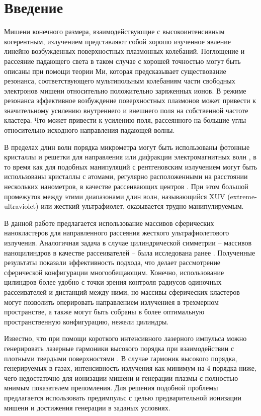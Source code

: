 \section{Введение}

Мишени конечного размера, взаимодействующие с высокоинтенсивным когерентным, излучением представляют собой хорошо изученное явление линейно возбужденных 
поверхностных плазмонных колебаний. Поглощение и рассеяние падающего света в таком случае с хорошей точностью могут быть описаны при помощи теории Ми, которая предсказывает существование резонанса, соответствующего мультипольным колебаниям части свободных электронов мишени относительно положительно заряженных ионов. В режиме резонанса эффективное возбуждение поверхностных плазмонов может привести к значительному усилению внутреннего и внешнего поля на собственной частоте кластера. Что может привести к усилению поля, рассеянного на большие углы относительно исходного направления падающей волны.

В пределах длин волн порядка микрометра могут быть использованы фотонные кристаллы и решетки для направления или дифракции электромагнитных волн \cite{lin_zhang}, в то время как для подобных манипуляций с рентгеновским излучением могут быть использованы кристаллы с атомами, регулярно расположенными на расстоянии нескольких нанометров, в качестве рассеивающих центров \cite{batterman_cole}. При этом большой промежуток между этими диапазонами длин волн, называющийся XUV (extreme-ultraviolet) или жесткий ультрафиолет, оказывается трудно манипулируемым.


В данной работе предлагается использование массивов сферических нанокластеров для направленного рассеяния жесткого ультрафиолетового излучения. Аналогичная задача в случае цилиндрической симметрии -- массивов наноцилиндров в качестве рассеивателей -- была исследована ранее \cite{andreev_lecz}. Полученные результаты показали эффективность подхода, что делает рассмотрение сферической конфигурации многообещающим. Конечно, использование цилиндров более удобно с точки зрения контроля радиусов одиночных рассеивателей и дистанций между ними, но массивы сферических кластеров могут позволить оперировать направлением излучениея в трехмерном пространстве, а также могут быть собраны в более оптимальную пространственную конфигурацию, нежели цилиндры.

Известно, что при помощи короткого интенсивного лазерного импульса можно генерировать лазерные гармоники высокого порядка при взаимодействии с плотными твердыми поверхностями \cite{teubner_gibbon_hoh}. В случае гармоник высокого порядка, генерируемых в газах, интенсивность излучения как минимум на 4 порядка ниже, чего недостаточно для ионизации мишени и генерации плазмы с полностью мнимым показателем преломления. Для решения подобной проблемы предлагается использовать предимпульс с целью предварительной ионизации мишени и достижения генерации в заданых условиях. 


